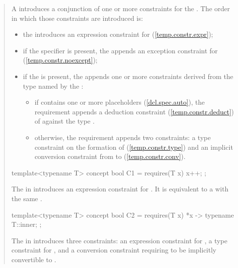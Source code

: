 \begin{quote}
\pnum
A  introduces 
a conjunction of one or more constraints for the
 . The order in which
those constraints are introduced is:
%
\begin{itemize}
\item the  introduces an expression 
constraint for  (\ref{temp.constr.expr});

\item if the  specifier is present, the 
 appends an exception constraint for 
 (\ref{temp.constr.noexcept});

\item if the  is present, the
 appends one or more constraints derived 
from the type  named by the :

\begin{itemize}
\item if  contains one or more placeholders (\ref{dcl.spec.auto}), 
the requirement appends a deduction constraint (\ref{temp.constr.deduct}) 
of  against the type .

\item otherwise, the requirement appends two constraints:
a type constraint on the formation of  (\ref{temp.constr.type}) and
an implicit conversion constraint from  to 
(\ref{temp.constr.conv}).
\end{itemize}
\end{itemize}
%
\enterexample
\begin{codeblock}
template<typename T> concept bool C1 =
  requires(T x) {
    {x++};
  };
\end{codeblock}
The  in  
introduces an expression constraint for .
It is equivalent to a 
with the same .

\begin{codeblock}
template<typename T> concept bool C2 =
  requires(T x) {
    {*x} -> typename T::inner;
  };
\end{codeblock}

The  in  
introduces three constraints: an expression constraint for , 
a type constraint for , and a conversion 
constraint requiring  to be implicitly convertible to
.


\end{quote}

